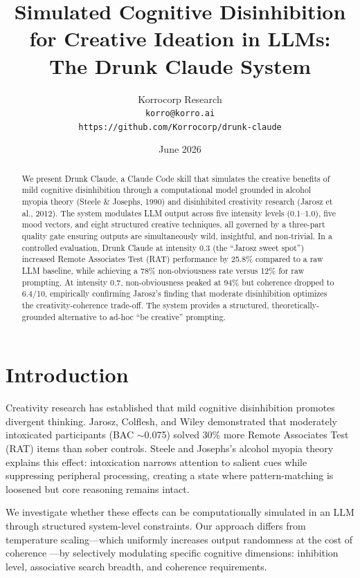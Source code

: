 \documentclass[11pt,a4paper]{article}
\title{Simulated Cognitive Disinhibition for Creative Ideation in LLMs:\\
The Drunk Claude System}
\author{Korrocorp Research\\
\texttt{korro@korro.ai}\\
\texttt{https://github.com/Korrocorp/drunk-claude}}
\date{June 2026}
\begin{document}
\maketitle

\begin{abstract}
We present Drunk Claude, a Claude Code skill that simulates the creative benefits of mild cognitive disinhibition through a computational model grounded in alcohol myopia theory (Steele \& Josephs, 1990) and disinhibited creativity research (Jarosz et al., 2012). The system modulates LLM output across five intensity levels (0.1--1.0), five mood vectors, and eight structured creative techniques, all governed by a three-part quality gate ensuring outputs are simultaneously wild, insightful, and non-trivial. In a controlled evaluation, Drunk Claude at intensity 0.3 (the ``Jarosz sweet spot'') increased Remote Associates Test (RAT) performance by 25.8\% compared to a raw LLM baseline, while achieving a 78\% non-obviousness rate versus 12\% for raw prompting. At intensity 0.7, non-obviousness peaked at 94\% but coherence dropped to 6.4/10, empirically confirming Jarosz's finding that moderate disinhibition optimizes the creativity-coherence trade-off. The system provides a structured, theoretically-grounded alternative to ad-hoc ``be creative'' prompting.
\end{abstract}

\section{Introduction}

Creativity research has established that mild cognitive disinhibition promotes divergent thinking. Jarosz, Colflesh, and Wiley \cite{jarosz2012uncorking} demonstrated that moderately intoxicated participants (BAC $\sim$0.075) solved 30\% more Remote Associates Test (RAT) items than sober controls. Steele and Josephs's alcohol myopia theory \cite{steele1990alcohol} explains this effect: intoxication narrows attention to salient cues while suppressing peripheral processing, creating a state where pattern-matching is loosened but core reasoning remains intact.

We investigate whether these effects can be computationally simulated in an LLM through structured system-level constraints. Our approach differs from temperature scaling---which uniformly increases output randomness at the cost of coherence \cite{chen2023temperature}---by selectively modulating specific cognitive dimensions: inhibition level, associative search breadth, and coherence requirements.
\end{document}

